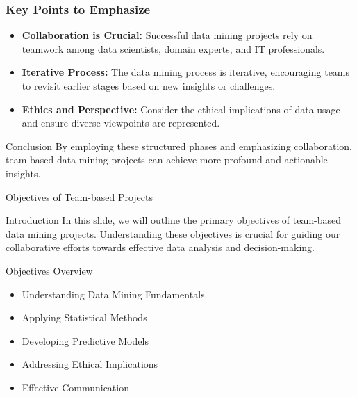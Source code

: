 \documentclass[aspectratio=169]{beamer}
\begin{document}
\begin{frame}[fragile]
    \frametitle{Key Points to Emphasize}
    
    \begin{itemize}
        \item \textbf{Collaboration is Crucial:} Successful data mining projects rely on teamwork among data scientists, domain experts, and IT professionals.
        \item \textbf{Iterative Process:} The data mining process is iterative, encouraging teams to revisit earlier stages based on new insights or challenges.
        \item \textbf{Ethics and Perspective:} Consider the ethical implications of data usage and ensure diverse viewpoints are represented.
    \end{itemize}
    
    \begin{block}{Conclusion}
        By employing these structured phases and emphasizing collaboration, team-based data mining projects can achieve more profound and actionable insights.
    \end{block}
\end{frame}

\begin{frame}[fragile]{Objectives of Team-based Projects}
    \begin{block}{Introduction}
        In this slide, we will outline the primary objectives of team-based data mining projects. Understanding these objectives is crucial for guiding our collaborative efforts towards effective data analysis and decision-making.
    \end{block}
\end{frame}

\begin{frame}[fragile]{Objectives Overview}
    \begin{itemize}
        \item Understanding Data Mining Fundamentals
        \item Applying Statistical Methods
        \item Developing Predictive Models
        \item Addressing Ethical Implications
        \item Effective Communication
    \end{itemize}
\end{frame}
\end{document}
